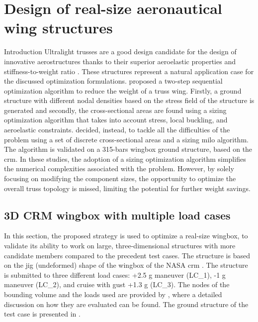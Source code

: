 \setchapterpreamble[u]{\margintoc}
\glsresetall %

\chapter{Design of real-size aeronautical wing structures}
Introduction
Ultralight trusses are a good design candidate for the design of innovative aerostructures thanks to their superior aeroelastic properties and stiffness-to-weight ratio \cite{cramer_elastic_2019}. These structures represent a natural application case for the discussed optimization formulations. \cite{opgenoord_aeroelastic_2018, opgenoord_design_2019} proposed a two-step sequential optimization algorithm to reduce the weight of a truss wing. Firstly, a ground structure with different nodal densities based on the stress field of the structure is generated and secondly, the cross-sectional areas are found using a sizing optimization algorithm that takes into account stress, local buckling, and aeroelastic constraints. \cite{shahabsafa_novel_2018} decided, instead, to tackle all the difficulties of the problem using a set of discrete cross-sectional areas and a sizing \gls{milo} algorithm. The algorithm is validated on a 315-bars wingbox ground structure, based on the \gls{crm}. In these studies, the adoption of a sizing optimization algorithm simplifies the numerical complexities associated with the problem. However, by solely focusing on modifying the component sizes, the opportunity to optimize the overall truss topology is missed, limiting the potential for further weight savings.
\section{3D CRM wingbox with multiple load cases}

In this section, the proposed strategy is used to optimize a real-size wingbox, to validate its ability to work on large, three-dimensional structures with more candidate members compared to the precedent test cases. The structure is based on the jig (undeformed) shape of the wingbox of the NASA \gls{crm} \cite{brooks_benchmark_2018}. The structure is submitted to three different load cases: +2.5 g maneuver (LC\_1), -1 g maneuver (LC\_2), and cruise with gust +1.3 g (LC\_3). The nodes of the bounding volume and the loads used are provided by \cite{fakhimi_discrete_2021}, where a detailed discussion on how they are evaluated can be found. The ground structure of the test case is presented in .

